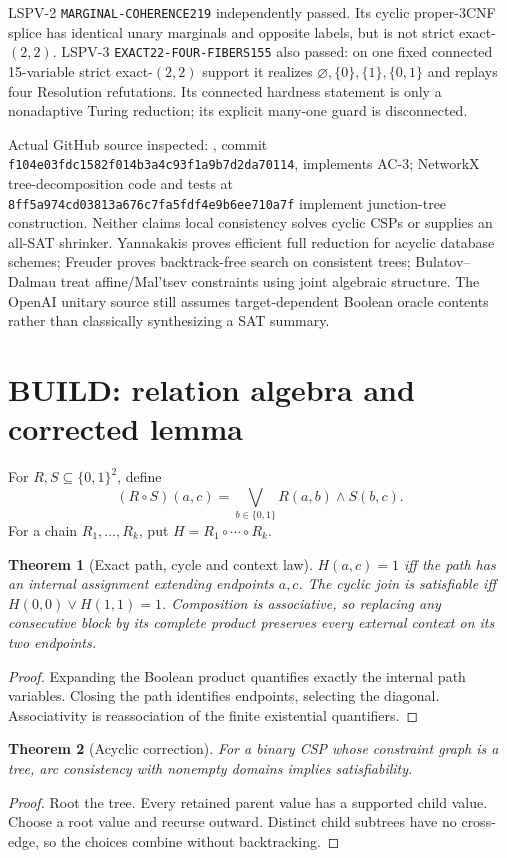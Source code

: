 \documentclass[11pt]{article}
\newtheorem{theorem}{Theorem}
\begin{document}
LSPV-2 \texttt{MARGINAL-COHERENCE219} independently passed. Its cyclic
proper-3CNF splice has identical unary marginals and opposite labels, but is
not strict exact-$(2,2)$. LSPV-3 \texttt{EXACT22-FOUR-FIBERS155} also passed:
on one fixed connected 15-variable strict exact-$(2,2)$ support it realizes
$\varnothing,\{0\},\{1\},\{0,1\}$ and replays four Resolution refutations.
Its connected hardness statement is only a nonadaptive Turing reduction; its
explicit many-one guard is disconnected.

Actual GitHub source inspected:
, commit
\texttt{f104e03fdc1582f014b3a4c93f1a9b7d2da70114}, implements AC-3;
NetworkX tree-decomposition code and tests at
\texttt{8ff5a974cd03813a676c7fa5fdf4e9b6ee710a7f} implement junction-tree
construction. Neither claims local consistency solves cyclic CSPs or supplies
an all-SAT shrinker. Yannakakis proves efficient full reduction for acyclic
database schemes; Freuder proves backtrack-free search on consistent trees;
Bulatov--Dalmau treat affine/Mal'tsev constraints using joint algebraic
structure. The OpenAI unitary source still assumes target-dependent Boolean
oracle contents rather than classically synthesizing a SAT summary.

\section{BUILD: relation algebra and corrected lemma}
For $R,S\subseteq\{0,1\}^2$, define
\[
 (R\circ S)(a,c)=\bigvee_{b\in\{0,1\}}R(a,b)\wedge S(b,c).
\]
For a chain $R_1,\ldots,R_k$, put $H=R_1\circ\cdots\circ R_k$.

\begin{theorem}[Exact path, cycle and context law]
$H(a,c)=1$ iff the path has an internal assignment extending endpoints
$a,c$. The cyclic join is satisfiable iff $H(0,0)\vee H(1,1)=1$.
Composition is associative, so replacing any consecutive block by its complete
product preserves every external context on its two endpoints.
\end{theorem}
\begin{proof}
Expanding the Boolean product quantifies exactly the internal path variables.
Closing the path identifies endpoints, selecting the diagonal. Associativity
is reassociation of the finite existential quantifiers.
\end{proof}

\begin{theorem}[Acyclic correction]
For a binary CSP whose constraint graph is a tree, arc consistency with
nonempty domains implies satisfiability.
\end{theorem}
\begin{proof}
Root the tree. Every retained parent value has a supported child value.
Choose a root value and recurse outward. Distinct child subtrees have no
cross-edge, so the choices combine without backtracking.
\end{proof}
\end{document}
